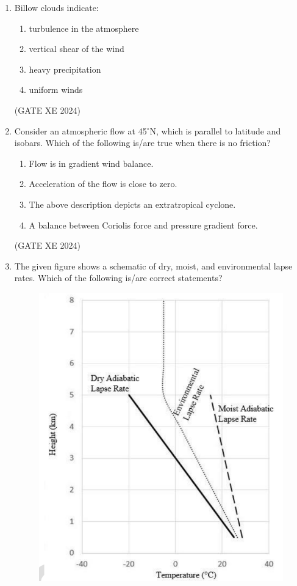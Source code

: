 \documentclass[12pt]{article}
\begin{document}
\begin{enumerate}
(GATE XE 2024)

\item Billow clouds indicate:

\begin{enumerate}
\item turbulence in the atmosphere  
\item vertical shear of the wind  
\item heavy precipitation  
\item uniform winds  
\end{enumerate}

(GATE XE 2024)

\item Consider an atmospheric flow at 45$^\circ$N, which is parallel to latitude and isobars.  
Which of the following is/are true when there is no friction?

\begin{enumerate}
\item Flow is in gradient wind balance.  
\item Acceleration of the flow is close to zero.  
\item The above description depicts an extratropical cyclone.  
\item A balance between Coriolis force and pressure gradient force.  
\end{enumerate}

(GATE XE 2024)

\item The given figure shows a schematic of dry, moist, and environmental lapse rates.  
Which of the following is/are correct statements?

\begin{figure}[H]
    \centering
    \includegraphics[width=0.5\columnwidth]{figs/ass5_h_q168.png}
    \caption{}
    \label{fig:placeholder}
\end{figure}


\end{enumerate}
\end{document}
